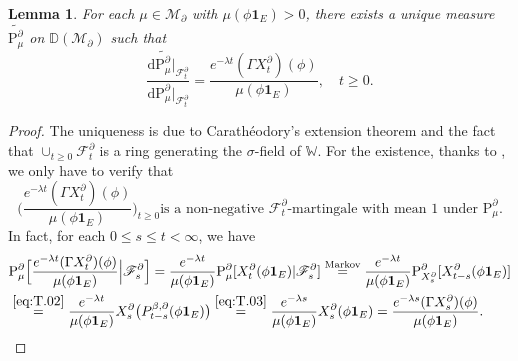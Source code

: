 \documentclass[12pt,a4paper]{amsart}
\numberwithin{equation}{section}
\theoremstyle{plain}
\newtheorem{lem}[thm]{Lemma}
\theoremstyle{definition}
\theoremstyle{remark}
\begin{document}
\begin{lem} \label{thm:T.3}
	For each $\mu \in \mathcal M_\partial$ with $\mu(\phi\mathbf 1_E)>0$, there exists
	a unique measure $\widetilde {\mathrm P_{\mu}^\partial}$ on $\mathbb D(\mathcal M_\partial)$ such that
\[
	\frac{\mathrm d \widetilde {\mathrm P_\mu^\partial} |_{\mathscr F_t^\partial}}{\mathrm d \mathrm P^\partial_\mu|_{\mathscr F_t^\partial}} = \frac{e^{-\lambda t}(\Gamma X^\partial_t)(\phi)}{\mu(\phi\mathbf 1_E)}, \quad t\geq 0.
\]
\end{lem}
\begin{proof}
	The uniqueness is due to Carath\'eodory's extension theorem and the fact that $\cup_{t\geq 0}\mathscr F_t^\partial$ is a ring generating the $\sigma$-field of $\mathbb W$.
	For the existence, thanks to \cite[Lemma 18.18]{Kallenberg2002Foundations}, we only have to verify that
\[
	\Big(\frac{e^{-\lambda t} (\Gamma X_t^\partial)(\phi)}{\mu(\phi \mathbf 1_E)}\Big)_{t\geq 0} \text{is a non-negative $\mathscr F_t^\partial$-martingale with mean $1$ under $\mathrm P_\mu^\partial$.}
\]
	In fact, for each $0\leq s\leq t<\infty$, we have
\begin{align}
	& \mathrm P_\mu^\partial  \Big[\frac{e^{-\lambda t} (\Gamma X_t^\partial)(\phi)}{\mu(\phi \mathbf 1_E)}\Big| \mathscr F^\partial_s\Big]
	= \frac{e^{-\lambda t}}{\mu(\phi \mathbf 1_E)} \mathrm P_\mu^\partial  [X_t^\partial(\phi \mathbf 1_E) | \mathscr F^\partial_s]
	\overset{\text{Markov}}= \frac{e^{-\lambda t}}{\mu(\phi \mathbf 1_E)} \mathrm P^\partial_{X_s^\partial}[X_{t-s}^\partial (\phi \mathbf 1_E)]
	\\ & \overset{\eqref{eq:T.02}}= \frac{e^{-\lambda t}}{\mu(\phi \mathbf 1_E)} X_s^\partial \big(P^{\beta, \partial}_{t-s} (\phi\mathbf 1_E)\big)
	\overset{\eqref{eq:T.03}}= \frac{e^{-\lambda s}}{\mu(\phi \mathbf 1_E)} X_s^\partial (\phi\mathbf 1_E)
	= \frac{e^{-\lambda s} (\Gamma X_s^\partial)(\phi)}{\mu(\phi \mathbf 1_E)}.
	\qedhere
\end{align}
\end{proof}
\end{document}
